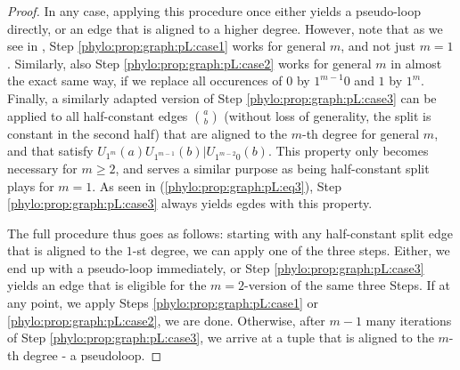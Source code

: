 \documentclass[a4paper,reqno, cleveref]{amsart}
\DeclareMathOperator{\pr}{pr}
\newcommand\mo[1]{\textcolor{black}{#1}} %
\begin{document}
\begin{proof}
    In any case, applying this procedure once either yields a pseudo-loop directly, or an edge that is aligned to a higher degree. 
    However, note that as we see in , Step \ref{phylo:prop:graph:pL:case1} works for general $m$, and not just $m=1$.
    Similarly, also Step \ref{phylo:prop:graph:pL:case2} works for general $m$ in almost the exact same way, if we replace all occurences of $0$ by $1^{m-1}0$ and $1$ by $1^{m}$. 
    Finally, a similarly adapted version of Step \ref{phylo:prop:graph:pL:case3} can be applied to all half-constant edges $\binom{a}{b}$ (without loss of generality, the split is constant in the second half) that are aligned to the $m$-th degree for general $m$, and that satisfy $U_{1^m}(a)U_{1^{m-1}}(b)|U_{1^{m-2}0}(b)$. This property only becomes necessary for $m\geq2$, and serves a similar purpose as being half-constant split plays for $m=1$.
    As seen in (\ref{phylo:prop:graph:pL:eq3}), Step \ref{phylo:prop:graph:pL:case3} always yields egdes with this property.

    The full procedure thus goes as follows: starting with any half-constant split edge that is aligned to the $1$-st degree, we can apply one of the three steps. Either, we end up with a pseudo-loop immediately, or Step \ref{phylo:prop:graph:pL:case3} yields an edge that is eligible for the $m=2$-version of the same three Steps. 
    If at any point, we apply Steps \ref{phylo:prop:graph:pL:case1} or \ref{phylo:prop:graph:pL:case2}, we are done. 
    Otherwise, after $m-1$ many iterations of Step \ref{phylo:prop:graph:pL:case3}, we arrive at a tuple that is aligned to the $m$-th degree - a pseudoloop.
\end{proof}



%



    
\end{document}
